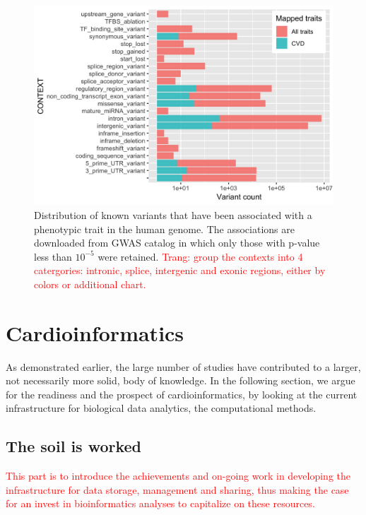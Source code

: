 \documentclass[letter]{bioinfo}
\newcommand{\comment}[1]{\textcolor{red}{#1}}
\begin{document}
\begin{figure}[!tpb]
	\includegraphics[width=1\linewidth]{variant_contexts_sigVars}
	\caption{Distribution of known variants that have been associated with a phenotypic trait in the human genome. The associations are downloaded from GWAS catalog \citep{MacArthur:2017:new} in which only those with p-value less than $10^{-5}$ were retained. \comment{Trang: group the contexts into 4 catergories: intronic, splice, intergenic and exonic regions, either by colors or additional chart.}}
	\label{fig:variant_context}
\end{figure}

%




%
\section{Cardioinformatics}
As demonstrated earlier, the large number of studies have contributed to a larger, not necessarily more solid, body of knowledge. In the following section, we argue for the readiness and the prospect of cardioinformatics, by looking at the current infrastructure for biological data analytics, the computational methods.

\subsection{The soil is worked}

\comment{This part is to introduce the achievements and on-going work in developing the infrastructure for data storage, management and sharing, thus making the case for an invest in bioinformatics analyses to capitalize on these resources.}
\end{document}
